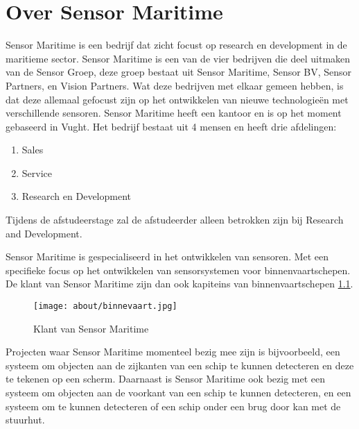 \chapter{Over Sensor Maritime}
Sensor Maritime is een bedrijf dat zicht focust op research en development in de maritieme sector. Sensor Maritime is een van de vier bedrijven die deel uitmaken van de Sensor Groep, deze groep bestaat uit Sensor Maritime, Sensor BV, Sensor Partners, en Vision Partners. Wat deze bedrijven met elkaar gemeen hebben, is dat deze allemaal gefocust zijn op het ontwikkelen van nieuwe technologieën met verschillende sensoren. Sensor Maritime heeft een kantoor en is op het moment gebaseerd in Vught. Het bedrijf bestaat uit 4 mensen en heeft drie afdelingen:
\begin{enumerate}
	\item Sales
	\item Service
	\item Research en Development
\end{enumerate}
Tijdens de afstudeerstage zal de afstudeerder alleen betrokken zijn bij Research and Development.
\newline

\noindent Sensor Maritime is gespecialiseerd in het ontwikkelen van sensoren. Met een specifieke focus op het ontwikkelen van sensorsystemen voor binnenvaartschepen. De klant van Sensor Maritime zijn dan ook kapiteins van binnenvaartschepen \ref{fig:customer_sensor_maritime}.
\begin{figure}[h!]

	\centering
	\caption{Klant van Sensor Maritime}
	\label{fig:customer_sensor_maritime}
	\texttt{[image: about/binnevaart.jpg]}
	

\end{figure}

\noindent Projecten waar Sensor Maritime momenteel bezig mee zijn is bijvoorbeeld, een systeem om objecten aan de zijkanten van een schip te kunnen detecteren en deze te tekenen op een scherm. Daarnaast is Sensor Maritime ook bezig met een systeem om objecten aan de voorkant van een schip te kunnen detecteren, en een systeem om te kunnen detecteren of een schip onder een brug door kan met de stuurhut.
